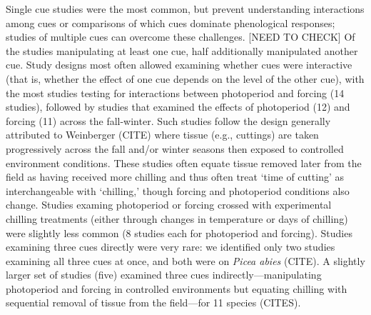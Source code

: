 \documentclass[11pt,letter]{article}
\begin{document}
Single cue studies were the most common, but prevent understanding interactions among cues or comparisons of which cues dominate phenological responses; studies of multiple cues can overcome these challenges. [NEED TO CHECK] Of the studies manipulating at least one cue, half additionally manipulated another cue. Study designs most often allowed examining whether cues were interactive (that is, whether the effect of one cue depends on the level of the other cue), with the most studies testing for interactions between photoperiod and forcing (14 studies), followed by studies that examined the effects of photoperiod (12) and forcing (11) across the fall-winter. Such studies follow the design generally attributed to Weinberger (CITE) where tissue (e.g., cuttings) are taken progressively across the fall and/or winter seasons then exposed to controlled environment conditions. These studies often equate tissue removed later from the field as having received more chilling and thus often treat `time of cutting' as interchangeable with `chilling,' though forcing and photoperiod conditions also change. Studies examing photoperiod or forcing crossed with experimental chilling treatments (either through changes in temperature or days of chilling) were slightly less common (8 studies each for photoperiod and forcing). Studies examining three cues directly were very rare: we identified only two studies examining all three cues at once, and both were on \emph{Picea abies} (CITE). A slightly larger set of studies (five) examined three cues indirectly---manipulating photoperiod and forcing in controlled environments but equating chilling with sequential removal of tissue from the field---for 11 species (CITES). \\
\end{document}
